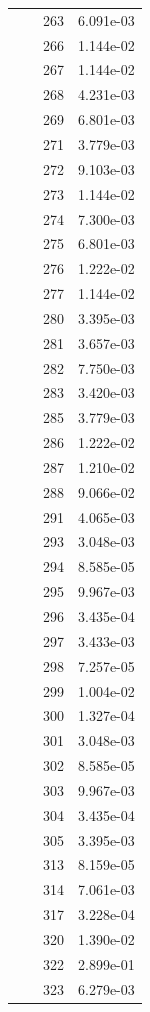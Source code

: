 \documentclass[12pt]{article}
\begin{document}
\begin{longtable}{@{}cccc@{}}
 &  & 263 & 6.091e-03 \\
 &  & 266 & 1.144e-02 \\
 &  & 267 & 1.144e-02 \\
 &  & 268 & 4.231e-03 \\
 &  & 269 & 6.801e-03 \\
 &  & 271 & 3.779e-03 \\
 &  & 272 & 9.103e-03 \\
 &  & 273 & 1.144e-02 \\
 &  & 274 & 7.300e-03 \\
 &  & 275 & 6.801e-03 \\
 &  & 276 & 1.222e-02 \\
 &  & 277 & 1.144e-02 \\
 &  & 280 & 3.395e-03 \\
 &  & 281 & 3.657e-03 \\
 &  & 282 & 7.750e-03 \\
 &  & 283 & 3.420e-03 \\
 &  & 285 & 3.779e-03 \\
 &  & 286 & 1.222e-02 \\
 &  & 287 & 1.210e-02 \\
 &  & 288 & 9.066e-02 \\
 &  & 291 & 4.065e-03 \\
 &  & 293 & 3.048e-03 \\
 &  & 294 & 8.585e-05 \\
 &  & 295 & 9.967e-03 \\
 &  & 296 & 3.435e-04 \\
 &  & 297 & 3.433e-03 \\
 &  & 298 & 7.257e-05 \\
 &  & 299 & 1.004e-02 \\
 &  & 300 & 1.327e-04 \\
 &  & 301 & 3.048e-03 \\
 &  & 302 & 8.585e-05 \\
 &  & 303 & 9.967e-03 \\
 &  & 304 & 3.435e-04 \\
 &  & 305 & 3.395e-03 \\
 &  & 313 & 8.159e-05 \\
 &  & 314 & 7.061e-03 \\
 &  & 317 & 3.228e-04 \\
 &  & 320 & 1.390e-02 \\
 &  & 322 & 2.899e-01 \\
 &  & 323 & 6.279e-03 \\

\end{longtable}
\end{document}
